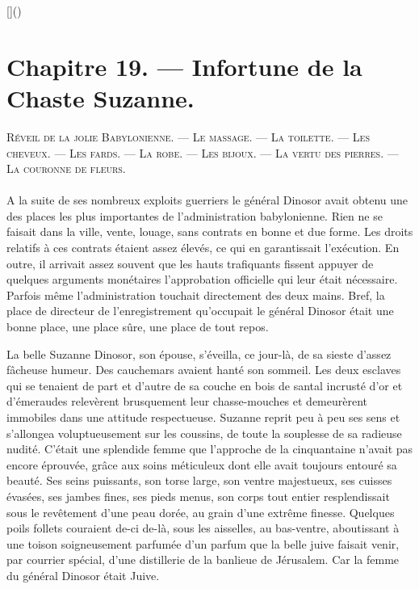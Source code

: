\documentclass[a4paper, 11pt, oneside, polutonikogreek, french]{article}
\begin{document}
[]()
\clearpage
\section{Chapitre 19. --- Infortune de la Chaste Suzanne.}
\begin{center}
\scshape
\small
Réveil de la jolie Babylonienne. --- Le massage. --- La toilette. --- Les cheveux. --- Les fards. --- La robe. --- Les bijoux. --- La vertu des pierres. --- La couronne de fleurs.
\end{center}
\paragraph{}
A la suite de ses nombreux exploits guerriers le général Dinosor avait obtenu une des places les plus importantes de l'administration babylonienne. Rien ne se faisait dans la ville, vente, louage, sans contrats en bonne et due forme. Les droits relatifs à ces contrats étaient assez élevés, ce qui en garantissait l'exécution. En outre, il arrivait assez souvent que les hauts trafiquants fissent appuyer de quelques arguments monétaires l'approbation officielle qui leur était nécessaire. Parfois même l'administration touchait directement des deux mains. Bref, la place de directeur de l'enregistrement qu'occupait le général Dinosor était une bonne place, une place sûre, une place de tout repos.

\bigskip
\centerline{\EightStarTaper}
\centerline{\EightStarTaper\EightStarTaper}
\bigskip

La belle Suzanne Dinosor, son épouse, s'éveilla, ce jour-là, de sa sieste d'assez fâcheuse humeur. Des cauchemars avaient hanté son sommeil. Les deux esclaves qui se tenaient de part et d'autre de sa couche en bois de santal incrusté d'or et d'émeraudes relevèrent brusquement leur chasse-mouches et demeurèrent immobiles dans une attitude respectueuse. Suzanne reprit peu à peu ses sens et s'allongea voluptueusement sur les coussins, de toute la souplesse de sa radieuse nudité. C'était une splendide femme que l'approche de la cinquantaine n'avait pas encore éprouvée, grâce aux soins méticuleux dont elle avait toujours entouré sa beauté. Ses seins puissants, son torse large, son ventre majestueux, ses cuisses évasées, ses jambes fines, ses pieds menus, son corps tout entier resplendissait sous le revêtement d'une peau dorée, au grain d'une extrême finesse. Quelques poils follets couraient de-ci de-là, sous les aisselles, au bas-ventre, aboutissant à une toison soigneusement parfumée d'un parfum que la belle juive faisait venir, par courrier spécial, d'une distillerie de la banlieue de Jérusalem. Car la femme du général Dinosor était Juive.
\end{document}
